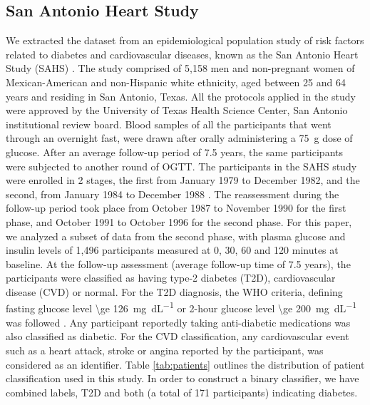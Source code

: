 \documentclass[a4paper,twoside]{article}
\begin{document}
\subsection{San Antonio Heart Study}
% 
We extracted the dataset from an epidemiological population study of risk factors related to diabetes and cardiovascular diseases, known as the San Antonio Heart Study (SAHS) \cite{burke_rapid_1999,lorenzo_trend_2006}. The study comprised of 5,158 men and non-pregnant women of Mexican-American and non-Hispanic white ethnicity, aged between \num{25} and \num{64} years and residing in San Antonio, Texas. All the protocols applied in the study were approved by the University of Texas Health Science Center, San Antonio institutional review board. Blood samples of all the participants that went through an overnight fast, were drawn after orally administering a \SI{75}{\gram} dose of glucose.
After an average follow-up period of \num{7.5} years, the same participants were subjected to another round of OGTT.  The participants in the SAHS study were enrolled in 2 stages, the first from January \num{1979} to December \num{1982}, and the second, from January \num{1984} to December \num{1988} \cite{haffner_hyperinsulinemia_1986}. The reassessment during the follow-up period took place from October \num{1987} to November \num{1990} for the first phase, and October \num{1991} to October \num{1996} for the second phase. For this paper, we analyzed a subset of data from the second phase, with plasma glucose and insulin levels of 1,496 participants  measured at \num{0}, \num{30}, \num{60} and \num{120} minutes at baseline. At the follow-up assessment (average follow-up time of 7.5 years), the participants were classified as having type-2 diabetes (T2D), cardiovascular disease (CVD) or normal. For the T2D diagnosis, the WHO criteria, defining fasting glucose level \SI[round-mode = off,group-separator = {,}]{\ge 126}{\milli\gram\per\deci\liter} or 2-hour glucose level \SI[round-mode = off,group-separator = {,}]{\ge 200}{\milli\gram\per\deci\liter} was followed \cite{wei_effects_1998}. Any participant reportedly taking anti-diabetic medications was also classified as diabetic. For the CVD classification, any cardiovascular event such as a heart attack, stroke or angina reported by the participant, was considered as an identifier. Table \ref{tab:patients} outlines the distribution of patient classification used in this study. In order to construct a binary classifier, we have combined labels, T2D and both (a total of \num{171} participants) indicating diabetes. 
% 
\end{document}

